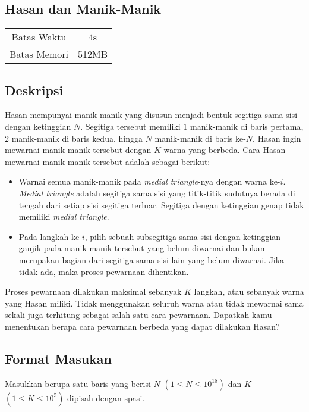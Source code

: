 \documentclass{article}
\begin{document}
\begin{center}
    \section*{Hasan dan Manik-Manik} %

    \begin{tabular}{ | c c | }
        \hline
        Batas Waktu  & 4s \\    %
        Batas Memori & 512MB \\  %
        \hline
    \end{tabular}
\end{center}

\subsection*{Deskripsi}

Hasan mempunyai manik-manik yang disusun menjadi bentuk segitiga sama sisi dengan ketinggian $N$. 
Segitiga tersebut memiliki $1$ manik-manik di baris pertama, $2$ manik-manik di baris kedua, hingga 
$N$ manik-manik di baris ke-$N$. Hasan ingin mewarnai manik-manik tersebut dengan $K$ warna yang berbeda. 
Cara Hasan mewarnai manik-manik tersebut adalah sebagai berikut: 
\begin{itemize}
\item Warnai semua manik-manik pada \textit{medial triangle}-nya dengan warna ke-$i$. \textit{Medial triangle} 
adalah segitiga sama sisi yang titik-titik sudutnya berada di tengah dari setiap sisi segitiga terluar. Segitiga dengan ketinggian genap tidak memiliki \textit{medial triangle}.

\item Pada langkah ke-$i$, pilih sebuah subsegitiga sama sisi dengan ketinggian ganjik pada manik-manik tersebut 
yang belum diwarnai dan bukan merupakan bagian dari segitiga sama sisi lain yang belum diwarnai. Jika tidak ada, 
maka proses pewarnaan dihentikan.
\end{itemize}
Proses pewarnaan dilakukan maksimal sebanyak $K$ langkah, atau sebanyak warna yang Hasan miliki. Tidak menggunakan 
seluruh warna atau tidak mewarnai sama sekali juga terhitung sebagai salah satu cara pewarnaan. Dapatkah kamu 
menentukan berapa cara pewarnaan berbeda yang dapat dilakukan Hasan?

\subsection*{Format Masukan}
Masukkan berupa satu baris yang berisi $N$ $(1 \leq N \leq 10^{18})$ dan $K$ $(1 \leq K \leq 10^5)$ dipisah dengan spasi.
\end{document}
